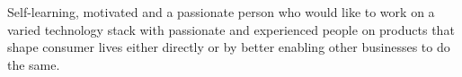 
\begin{cvparagraph}

Self-learning, motivated and a passionate person who would like to work on a
varied technology stack with passionate and experienced people on products that
shape consumer lives either directly or by better enabling other businesses to
do the same.
\end{cvparagraph}
